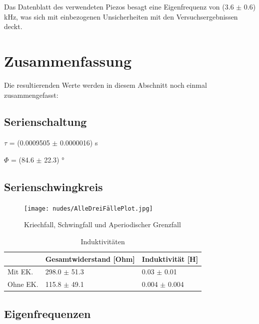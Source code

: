 \documentclass[12pt,a4paper,twoside]{article}
\begin{document}
\noindent
Das Datenblatt des verwendeten Piezos besagt eine Eigenfrequenz von (3.6 $\pm$ 0.6) kHz, was sich mit einbezogenen Unsicherheiten mit den Versuchsergebnissen deckt.



\section{Zusammenfassung} %

Die resultierenden Werte werden in diesem Abschnitt noch einmal zusammengefasst:

\subsection{Serienschaltung}

$\tau$ = (0.0009505 $\pm$ 0.0000016) s \newline

\noindent
$\Phi$ = (84.6 $\pm$ 22.3) °


\subsection{Serienschwingkreis}

\begin{figure}[H]
    \centering
    \texttt{[image: nudes/AlleDreiFällePlot.jpg]}
    \caption{Kriechfall, Schwingfall und Aperiodischer Grenzfall}
    \label{fig:AlleDreiFälleZusmf}
\end{figure}

\begin{table}[H]
    \centering
    \caption{Induktivitäten}
    \label{tab:Induktivitäten}
    \begin{tabular}{| l | l | l |}
        \hline
         & Gesamtwiderstand [Ohm] & Induktivität [H] \\
        \hline
        Mit EK. & 298.0 $\pm$ 51.3 & 0.03 $\pm$ 0.01 \\
        Ohne EK. & 115.8 $\pm$ 49.1 & 0.004 $\pm$  0.004 \\
        \hline
    \end{tabular}
\end{table}


\subsection{Eigenfrequenzen}
\end{document}
